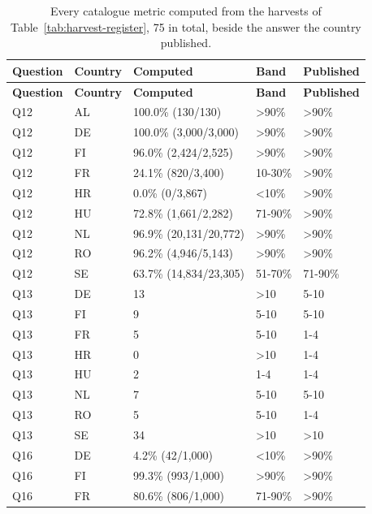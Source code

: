 {\footnotesize
\begin{longtable}[]{@{}
  L{0.1274}
  L{0.1177}
  L{0.3333}
  L{0.1470}
  L{0.2745}@{}}
\caption{Every catalogue metric computed from the harvests of Table~\ref{tab:harvest-register}, 75 in total, beside the answer the country published.}\label{tab:catalogue-metrics}\\
\toprule\noalign{}
\textbf{Question} & \textbf{Country} & \textbf{Computed} & \textbf{Band} & \textbf{Published} \\
\midrule\noalign{}
\endfirsthead
\toprule\noalign{}
\textbf{Question} & \textbf{Country} & \textbf{Computed} & \textbf{Band} & \textbf{Published} \\
\midrule\noalign{}
\endhead
\bottomrule\noalign{}
\endlastfoot
Q12 & AL & 100.0\% (130/130) & \textgreater90\% & \textgreater90\% \\
Q12 & DE & 100.0\% (3,000/3,000) & \textgreater90\% & \textgreater90\% \\
Q12 & FI & 96.0\% (2,424/2,525) & \textgreater90\% & \textgreater90\% \\
Q12 & FR & 24.1\% (820/3,400) & 10-30\% & \textgreater90\% \\
Q12 & HR & 0.0\% (0/3,867) & \textless10\% & \textgreater90\% \\
Q12 & HU & 72.8\% (1,661/2,282) & 71-90\% & \textgreater90\% \\
Q12 & NL & 96.9\% (20,131/20,772) & \textgreater90\% & \textgreater90\% \\
Q12 & RO & 96.2\% (4,946/5,143) & \textgreater90\% & \textgreater90\% \\
Q12 & SE & 63.7\% (14,834/23,305) & 51-70\% & 71-90\% \\
Q13 & DE & 13 & \textgreater10 & 5-10 \\
Q13 & FI & 9 & 5-10 & 5-10 \\
Q13 & FR & 5 & 5-10 & 1-4 \\
Q13 & HR & 0 & \textgreater10 & 1-4 \\
Q13 & HU & 2 & 1-4 & 1-4 \\
Q13 & NL & 7 & 5-10 & 5-10 \\
Q13 & RO & 5 & 5-10 & 1-4 \\
Q13 & SE & 34 & \textgreater10 & \textgreater10 \\
Q16 & DE & 4.2\% (42/1,000) & \textless10\% & \textgreater90\% \\
Q16 & FI & 99.3\% (993/1,000) & \textgreater90\% & \textgreater90\% \\
Q16 & FR & 80.6\% (806/1,000) & 71-90\% & \textgreater90\% \\

\end{longtable}}
